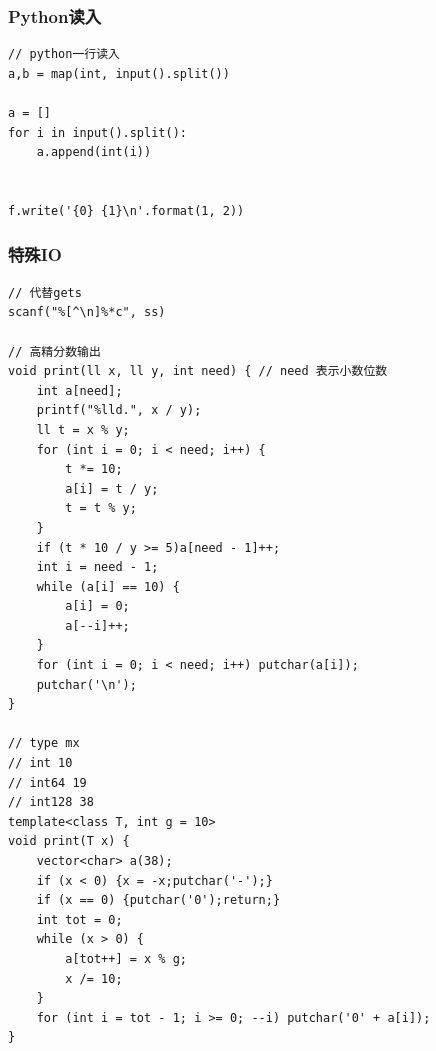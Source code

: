 \documentclass[twoside]{article}
\begin{document}
\subsubsection{Python读入}
\begin{lstlisting}
// python一行读入
a,b = map(int, input().split())

a = []
for i in input().split():
    a.append(int(i))


f.write('{0} {1}\n'.format(1, 2))\end{lstlisting}
\subsubsection{特殊IO}
\begin{lstlisting}
// 代替gets
scanf("%[^\n]%*c", ss)

// 高精分数输出
void print(ll x, ll y, int need) { // need 表示小数位数
    int a[need];
    printf("%lld.", x / y);
    ll t = x % y;
    for (int i = 0; i < need; i++) {
        t *= 10;
        a[i] = t / y;
        t = t % y;
    }
    if (t * 10 / y >= 5)a[need - 1]++;
    int i = need - 1;
    while (a[i] == 10) {
        a[i] = 0;
        a[--i]++;
    }
    for (int i = 0; i < need; i++) putchar(a[i]);
    putchar('\n');
}

// type mx
// int 10
// int64 19
// int128 38
template<class T, int g = 10>
void print(T x) {
    vector<char> a(38);
    if (x < 0) {x = -x;putchar('-');}
    if (x == 0) {putchar('0');return;}
    int tot = 0;
    while (x > 0) {
        a[tot++] = x % g;
        x /= 10;
    }
    for (int i = tot - 1; i >= 0; --i) putchar('0' + a[i]);
}\end{lstlisting}
\end{document}
